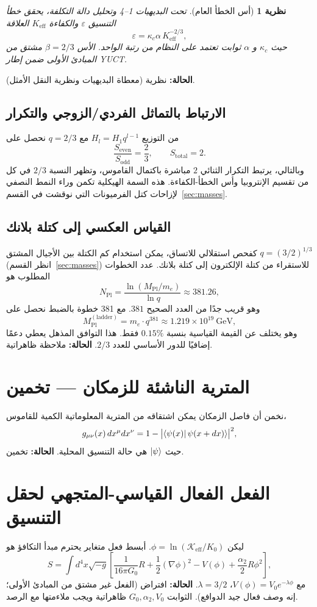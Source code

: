 \documentclass[11pt,a4paper]{article}
\newtheorem{theorem}{نظرية}[section]
\newcommand{\Mpl}{M_{\mathrm{Pl}}}
\begin{document}
	\begin{theorem}[أس الخطأ العام]
		تحت البديهيات 1–4 وتحليل دالة التكلفة، يحقق خطأ التنسيق \(\varepsilon\) والكفاءة \(K_{\mathrm{eff}}\) العلاقة
		\[
		\boxed{\varepsilon = \kappa_c \alpha \, K_{\mathrm{eff}}^{-2/3}},
		\]
		حيث \(\kappa_c\) و \(\alpha\) ثوابت تعتمد على النظام من رتبة الواحد. الأس \(\beta = 2/3\) مشتق من المبادئ الأولى ضمن إطار YUCT.
	\end{theorem}
	\textbf{الحالة:} نظرية (معطاة البديهيات ونظرية النقل الأمثل).
	
	\subsection{الارتباط بالتماثل الفردي/الزوجي والتكرار}
	من التوزيع \(H_l = H_1 q^{l-1}\) مع \(q=2/3\) نحصل على
	\[
	\frac{S_{\mathrm{even}}}{S_{\mathrm{odd}}} = \frac{2}{3}, \qquad S_{\mathrm{total}} = 2.
	\]
	وبالتالي، يرتبط التكرار الثنائي \(2\) مباشرة باكتمال القاموس، وتظهر النسبة \(2/3\) في كل من تقسيم الإنتروبيا وأس الخطأ-الكفاءة. هذه السمة الهيكلية تكمن وراء النمط النصفي لإزاحات كتل الفرميونات التي نوقشت في القسم~\ref{sec:masses}.
	
	\subsection{القياس العكسي إلى كتلة بلانك}
	كفحص استقلالي للاتساق، يمكن استخدام كم الكتلة بين الأجيال المشتق \(q = (3/2)^{1/3}\) (انظر القسم~\ref{sec:masses}) للاستقراء من كتلة الإلكترون إلى كتلة بلانك. عدد الخطوات المطلوب هو
	\[
	N_{\mathrm{Pl}} = \frac{\ln(\Mpl/m_e)}{\ln q} \approx 381.26,
	\]
	وهو قريب جدًا من العدد الصحيح \(381\). مع 381 خطوة بالضبط نحصل على
	\[
	\Mpl^{\mathrm{(ladder)}} = m_e \cdot q^{381} \approx 1.219\times10^{19}\ \mathrm{GeV},
	\]
	وهو يختلف عن القيمة القياسية بنسبة \(0.15\%\) فقط. هذا التوافق المذهل يعطي دعمًا إضافيًا للدور الأساسي للعدد \(2/3\). \textbf{الحالة:} ملاحظة ظاهراتية.
	
	\section{المترية الناشئة للزمكان — تخمين}
	\label{sec:metric}
	نخمن أن فاصل الزمكان يمكن اشتقاقه من المترية المعلوماتية الكمية للقاموس،
	\[
	g_{\mu\nu}(x) \, dx^\mu dx^\nu = 1 - \bigl| \bra{\psi(x)} \psi(x+dx) \rangle \bigr|^2,
	\]
	حيث \(\ket{\psi}\) هي حالة التنسيق المحلية. \textbf{الحالة:} تخمين.
	
	\section{الفعل الفعال القياسي-المتجهي لحقل التنسيق}
	\label{sec:action}
	ليكن \(\phi = \ln(\mathcal{K}_{\mathrm{eff}}/K_0)\). أبسط فعل متغاير يحترم مبدأ التكافؤ هو
	\begin{equation}
		S = \int d^4x\sqrt{-g}\left[ \frac{1}{16\pi G_0} R + \frac12(\nabla\phi)^2 - V(\phi) + \frac{\alpha_2}{2}R\phi^2 \right],
		\label{eq:action}
	\end{equation}
	مع \(V(\phi) = V_0 e^{-\lambda\phi}\)، \(\lambda = 3/2\). \textbf{الحالة:} افتراض (الفعل غير مشتق من المبادئ الأولى؛ إنه وصف فعال جيد الدوافع). الثوابت \(G_0, \alpha_2, V_0\) ظاهراتية ويجب ملاءمتها مع الرصد.
	
\end{document}
